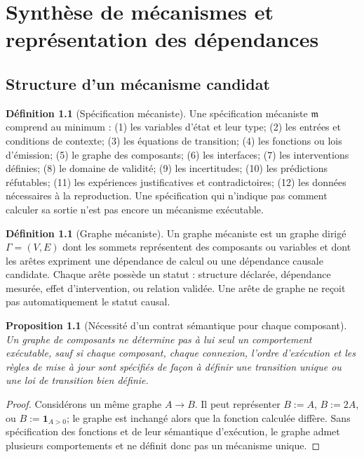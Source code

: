 \documentclass[11pt,oneside]{book}
\newtheorem{proposition}[theoreme]{Proposition}
\theoremstyle{definition}
\newtheorem{definition}[theoreme]{Définition}
\theoremstyle{remark}
\newcommand{\1}{\mathbf 1}
\begin{document}
\chapter{Synthèse de mécanismes et représentation des dépendances}
\section{Structure d'un mécanisme candidat}
\begin{definition}[Spécification mécaniste]
Une spécification mécaniste $\mathfrak m$ comprend au minimum : (1) les variables d'état et leur type; (2) les entrées et conditions de contexte; (3) les équations de transition; (4) les fonctions ou lois d'émission; (5) le graphe des composants; (6) les interfaces; (7) les interventions définies; (8) le domaine de validité; (9) les incertitudes; (10) les prédictions réfutables; (11) les expériences justificatives et contradictoires; (12) les données nécessaires à la reproduction. Une spécification qui n'indique pas comment calculer sa sortie n'est pas encore un mécanisme exécutable.
\end{definition}

\begin{definition}[Graphe mécaniste]
Un graphe mécaniste est un graphe dirigé $\Gamma=(V,E)$ dont les sommets représentent des composants ou variables et dont les arêtes expriment une dépendance de calcul ou une dépendance causale candidate. Chaque arête possède un statut : structure déclarée, dépendance mesurée, effet d'intervention, ou relation validée. Une arête de graphe ne reçoit pas automatiquement le statut causal.
\end{definition}

\begin{proposition}[Nécessité d'un contrat sémantique pour chaque composant]
Un graphe de composants ne détermine pas à lui seul un comportement exécutable, sauf si chaque composant, chaque connexion, l'ordre d'exécution et les règles de mise à jour sont spécifiés de façon à définir une transition unique ou une loi de transition bien définie.
\end{proposition}
\begin{proof}
Considérons un même graphe $A\to B$. Il peut représenter $B:=A$, $B:=2A$, ou $B:=\1_{A>0}$; le graphe est inchangé alors que la fonction calculée diffère. Sans spécification des fonctions et de leur sémantique d'exécution, le graphe admet plusieurs comportements et ne définit donc pas un mécanisme unique.\end{proof}
\end{document}
